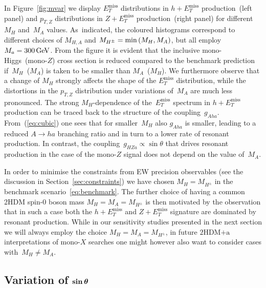 \documentclass[a4paper, 11pt,notoc]{article}
\newcommand{\MET}{\ensuremath{E_T^\mathrm{miss}}\xspace}
\newcommand{\mA}{\ensuremath{M_{A}}\xspace}
\newcommand{\mH}{\ensuremath{M_{H}}\xspace}
\newcommand{\mHc}{\ensuremath{M_{H^{\pm}}}\xspace}
\newcommand{\hdma}{\ensuremath{\textrm{2HDM+a}}\xspace}
\def\bm#1{\mbox{\boldmath$#1$\unboldmath}}
\begin{document}
In Figure~\ref{fig:mvar} we display $\MET$ distributions in $h + \MET$ production~(left panel) and $p_{T,Z}$ distributions in $Z+\MET$ production~(right panel) for different~$\mH$ and~$\mA$ values. As~indicated, the coloured histograms correspond to  different choices of $M_{H,A}$ and $\mHc = {\rm min} \left ( \mH, \mA \right )$, but all employ $M_a = 300 \, {\rm GeV}$. From the figure it is evident that the inclusive mono-Higgs~(mono-$Z$) cross section is reduced compared to the benchmark prediction if~$\mH$~($\mA$) is taken to be smaller than $\mA$~($\mH$).  We furthermore observe that  a change of $\mH$ strongly affects the shape of the $\MET$ distribution, while the distortions in the $p_{T,Z}$ distribution under variations of~$\mA$ are much less pronounced. The strong $M_H$-dependence of the~$\MET$ spectrum in $h + \MET$ production can be traced back to the structure of the coupling~$g_{Aha}$. From~(\ref{eq:cubic}) one sees that for smaller~$M_H$ also $g_{Aha}$ is smaller, leading to a reduced $A \to ha$ branching ratio  and in turn to a lower rate of resonant production.  In contrast, the coupling~$g_{HZa} \propto \sin \theta$ that drives resonant production in the case of the mono-$Z$ signal does not depend on the value of~$M_A$.

{\color{blue} In order to minimise the constraints from EW precision observables (see the discussion in Section~\ref{sec:constraints}) we have chosen $\mH = \mHc$ in the  benchmark scenario~\eqref{eq:benchmark}.} The further choice of having a common 2HDM  {\color{red} spin-0 boson}  mass $\mH = \mA = \mHc$ is then motivated by the observation that in such a case  both the $h + \MET$ and $Z + \MET$ signature are dominated by resonant production. While in our sensitivity studies presented in the next section we will always employ the choice $\mH = \mA = \mHc$, in future \hdma  interpretations of mono-$X$ searches one might however  also want to consider cases with~$\mH \neq \mA$. 

\subsection*{Variation of $\bm{\sin \theta}$}
\end{document}

